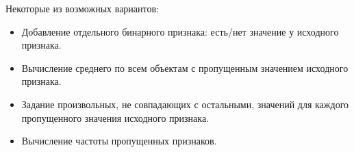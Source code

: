 Некоторые из возможных вариантов:
\begin{itemize}
	\item Добавление отдельного бинарного признака: есть/нет значение у исходного признака.
	\item Вычисление среднего по всем объектам с пропущенным значением исходного признака.
	\item Задание произвольных, не совпадающих с остальными, значений для каждого пропущенного значения исходного признака.
	\item Вычисление частоты пропущенных признаков.
\end{itemize}